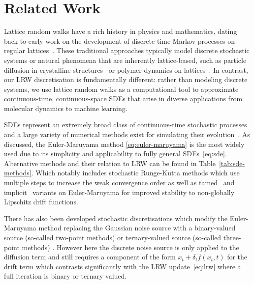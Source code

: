 \documentclass[pra,showpacs,amsmath,amssymb,amsfonts,lengthcheck,longbibliography,onecolumn]{revtex4-2}
\newcommand{\MA}[1]{{\color[RGB]{250, 0, 0}{MA: #1}}}
\begin{document}
\section{Related Work}\label{sec:related_work}

Lattice random walks have a rich history in physics and mathematics, dating back to early work on 
the development of discrete-time Markov processes on regular lattices~\cite{feller1950introduction}. These traditional approaches 
typically model discrete stochastic systems or natural phenomena that are inherently lattice-based, 
such as particle diffusion in crystalline structures~\cite{montroll1965random} or polymer dynamics on 
lattices~\cite{rubin1965random}.  In contrast,
our LRW discretisation is fundamentally different: rather than modeling discrete systems, 
we use lattice random walks as a computational tool to approximate continuous-time, continuous-space
SDEs that arise in diverse applications from molecular dynamics to machine learning.






SDEs represent an extremely broad class of continuous-time stochastic processes and
a large variety of numerical methods exist for simulating their evolution~\cite{sarkka2019applied}.
As discussed, the Euler-Maruyama method \eqref{eq:euler-maruyama} is the most widely used due to 
its simplicity and applicability to fully general SDEs~\eqref{eq:sde}. Alternative methods and their relation to LRW can be found in Table~\ref{tab:sde-methods}. Which notably includes stochastic Runge-Kutta methods \cite{debrabant2008classification} which use multiple steps to increase the weak convergence order as well as tamed~\citep{HutzenthalerJentzenKloeden2012} and implicit~\cite{hu1996semi} variants on Euler-Maruyama for improved stability to non-globally Lipschitz drift functions. 



There has also been developed stochastic discretisations
which modify the Euler-Maruyama method replacing the Gaussian noise source with a
binary-valued source (so-called two-point methods) or ternary-valued source (so-called
three-point methods) \cite{kloeden1992stochastic}. However here the discrete noise
source is only applied to the diffusion term and still requires a component of the form
$x_t + \delta_t f(x_t, t)$ for the drift term which contrasts significantly with the
LRW update~\eqref{eq:lrw} where a full iteration is binary or ternary
valued.
\end{document}
